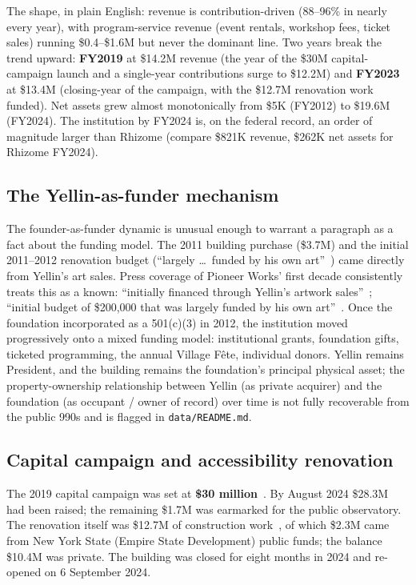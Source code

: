 \documentclass[10pt,letterpaper,twocolumn]{article}
\begin{document}
The shape, in plain English: revenue is contribution-driven (88--96\% in nearly every year), with program-service revenue (event rentals, workshop fees, ticket sales) running \$0.4--\$1.6M but never the dominant line. Two years break the trend upward: \textbf{FY2019} at \$14.2M revenue (the year of the \$30M capital-campaign launch and a single-year contributions surge to \$12.2M) and \textbf{FY2023} at \$13.4M (closing-year of the campaign, with the \$12.7M renovation work funded). Net assets grew almost monotonically from \$5K (FY2012) to \$19.6M (FY2024). The institution by FY2024 is, on the federal record, an order of magnitude larger than Rhizome (compare \$821K revenue, \$262K net assets for Rhizome FY2024).

\subsection{The Yellin-as-funder mechanism}

The founder-as-funder dynamic is unusual enough to warrant a paragraph as a fact about the funding model. The 2011 building purchase (\$3.7M) and the initial 2011--2012 renovation budget (``largely \dots\ funded by his own art''~\citep{fvf2017pioneer}) came directly from Yellin's art sales. Press coverage of Pioneer Works' first decade consistently treats this as a known: ``initially financed through Yellin's artwork sales''~\citep{fvf2017pioneer}; ``initial budget of \$200{,}000 that was largely funded by his own art''~\citep{fvf2017pioneer}. Once the foundation incorporated as a 501(c)(3) in 2012, the institution moved progressively onto a mixed funding model: institutional grants, foundation gifts, ticketed programming, the annual Village F\^ete, individual donors. Yellin remains President, and the building remains the foundation's principal physical asset; the property-ownership relationship between Yellin (as private acquirer) and the foundation (as occupant / owner of record) over time is not fully recoverable from the public 990s and is flagged in \texttt{data/README.md}.

\subsection{Capital campaign and accessibility renovation}

The 2019 capital campaign was set at \textbf{\$30 million}~\citep{archpaper2024reopen}. By August 2024 \$28.3M had been raised; the remaining \$1.7M was earmarked for the public observatory. The renovation itself was \$12.7M of construction work~\citep{esd2025renovation}, of which \$2.3M came from New York State (Empire State Development) public funds; the balance \$10.4M was private. The building was closed for eight months in 2024 and re-opened on 6 September 2024.
\end{document}
